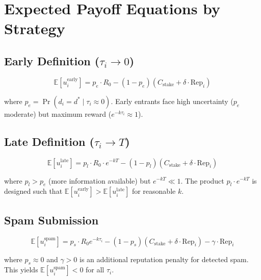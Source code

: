\documentclass[11pt]{article}
\begin{document}
\section{Expected Payoff Equations by Strategy}

\subsection{Early Definition ($\tau_i \to 0$)}

\begin{equation}
\mathbb{E}[u_i^{\text{early}}] = p_e \cdot R_0 - (1 - p_e)(C_{\text{stake}} + \delta \cdot \text{Rep}_i)
\end{equation}

where $p_e = \Pr(d_i = d^* \mid \tau_i \approx 0)$. Early entrants face high uncertainty ($p_e$ moderate) but maximum reward ($e^{-k\tau_i} \approx 1$).

\subsection{Late Definition ($\tau_i \to T$)}

\begin{equation}
\mathbb{E}[u_i^{\text{late}}] = p_l \cdot R_0 \cdot e^{-kT} - (1 - p_l)(C_{\text{stake}} + \delta \cdot \text{Rep}_i)
\end{equation}

where $p_l > p_e$ (more information available) but $e^{-kT} \ll 1$. The product $p_l \cdot e^{-kT}$ is designed such that $\mathbb{E}[u_i^{\text{early}}] > \mathbb{E}[u_i^{\text{late}}]$ for reasonable $k$.

\subsection{Spam Submission}

\begin{equation}
\mathbb{E}[u_i^{\text{spam}}] = p_s \cdot R_0 e^{-k\tau_i} - (1 - p_s)(C_{\text{stake}} + \delta \cdot \text{Rep}_i) - \gamma \cdot \text{Rep}_i
\end{equation}

where $p_s \approx 0$ and $\gamma > 0$ is an additional reputation penalty for detected spam. This yields $\mathbb{E}[u_i^{\text{spam}}] < 0$ for all $\tau_i$.

\end{document}
